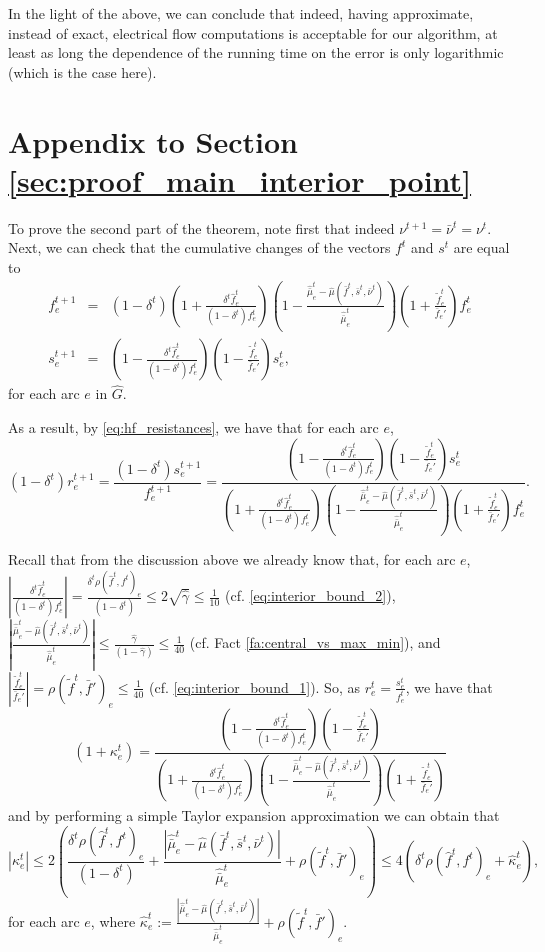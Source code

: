 \documentclass[11pt, letterpaper]{article}
\newcommand{\hG}{\widehat{G}}
\newcommand{\tf}{\tilde{f}}
\newcommand{\hf}{\hat{f}}
\newcommand{\of}{\bar{f}}
\newcommand{\hmu}{\hat{\mu}}
\newcommand{\ohmu}{\hat{\bar{\mu}}}
\newcommand{\hgamma}{\hat{\gamma}}
\newcommand{\hkappa}{\hat{\kappa}}
\newcommand{\vnu}{\boldsymbol{\mathit{\nu}}}
\newcommand{\ovnu}{\boldsymbol{\bar{\mathit{\nu}}}}
\newcommand{\ff}{\boldsymbol{\mathit{f}}}
\newcommand{\tff}{\boldsymbol{\mathit{\tilde{f}}}}
\newcommand{\off}{\boldsymbol{\mathit{\bar{f}}}}
\newcommand{\hff}{\boldsymbol{\mathit{\hat{f}}}}
\renewcommand{\ss}{\boldsymbol{\mathit{s}}}
\newcommand{\oss}{\boldsymbol{\bar{\mathit{s}}}}
\begin{document}
In the light of the above, we can conclude that indeed, having approximate, instead of exact, electrical flow computations is acceptable for our algorithm, at least as long the dependence of the running time on the error is only logarithmic (which is the case here). 
 \section{Appendix to Section \ref{sec:proof_main_interior_point}}\label{app:interior}


To prove the second part of the theorem, note first that indeed $\vnu^{t+1}=\ovnu^{t}=\vnu^t$. Next, we can check that the cumulative changes of the vectors $\ff^{t}$ and $\ss^t$ are equal to
\begin{eqnarray*}
f_e^{t+1} &=& (1-\delta^t)\left(1+\frac{\delta^t\hf^t_e}{(1-\delta^t)f_e^t}\right)\left(1-\frac{\ohmu_e^t-\hmu(\off^t,\oss^t,\ovnu^t)}{\ohmu_e^t}\right)\left(1+\frac{\tf^t_e}{\of_e'}\right)f_e^t\\
s_e^{t+1} &=& \left(1-\frac{\delta^t\hf^t_e}{(1-\delta^t)f_e^t}\right)\left(1-\frac{\tf^t_e}{\of_e'}\right)s_e^t,
\end{eqnarray*}
for each arc $e$ in $\hG$. 

As a result, by \eqref{eq:hf_resistances}, we have that for each arc $e$,
\[
(1-\delta^t)r_e^{t+1} = \frac{(1-\delta^t) s_e^{t+1}}{f_e^{t+1}} = \frac{\left(1-\frac{\delta^t\hf^t_e}{(1-\delta^t)f_e^t}\right)\left(1-\frac{\tf^t_e}{\of_e'}\right)s_e^t}{\left(1+\frac{\delta^t\hf^t_e}{(1-\delta^t)f_e^t}\right)\left(1-\frac{\ohmu_e^t-\hmu(\off^t,\oss^t,\ovnu^t)}{\ohmu_e^t}\right)\left(1+\frac{\tf^t_e}{\of_e'}\right)f_e^t}.
\]

Recall that from the discussion above we already know that, for each arc $e$,  $|\frac{\delta^t\hf^t_e}{(1-\delta^t)f_e^t}|=\frac{\delta^t\rho(\hff^t,\ff^t)_e}{(1-\delta^t)}\leq 2\sqrt{\hgamma}\leq \frac{1}{10}$ (cf. \eqref{eq:interior_bound_2}), $|\frac{\ohmu_e^t-\hmu(\off^t,\oss^t,\ovnu^t)}{\ohmu_e^t}|\leq \frac{\hgamma}{(1-\hgamma)} \leq \frac{1}{40}$ (cf. Fact \ref{fa:central_vs_max_min}), and $|\frac{\tf^t_e}{\of_e'}|=\rho(\tff^t,\off')_e\leq \frac{1}{40}$ (cf. \eqref{eq:interior_bound_1}). So, as $r_e^t=\frac{s_e^t}{f_e^t}$, we have that 
\[
(1+\kappa_e^t)=\frac{\left(1-\frac{\delta^t\hf^t_e}{(1-\delta^t)f_e^t}\right)\left(1-\frac{\tf^t_e}{\of_e'}\right)}{\left(1+\frac{\delta^t\hf^t_e}{(1-\delta^t)f_e^t}\right)\left(1-\frac{\ohmu_e^t-\hmu(\off^t,\oss^t,\ovnu^t)}{\ohmu_e^t}\right)\left(1+\frac{\tf^t_e}{\of_e'}\right)}
\]
and by performing a simple Taylor expansion approximation we can obtain that 
\[
|\kappa_e^t|\leq 2\left(\frac{\delta^t\rho(\hff^t,\ff^t)_e}{(1-\delta^t)}+ \frac{|\ohmu_e^t-\hmu(\off^t,\oss^t,\ovnu^t)|}{\ohmu_e^t}+\rho(\tff^t,\off')_e\right)\leq 4\left(\delta^t\rho(\hff^t,\ff^t)_e+\hkappa_e^t\right),
\]
for each arc $e$, where $\hkappa_e^t:=\frac{|\ohmu_e^t-\hmu(\off^t,\oss^t,\ovnu^t)|}{\ohmu_e^t}+\rho(\tff^t,\off')_e$. 
\end{document}

